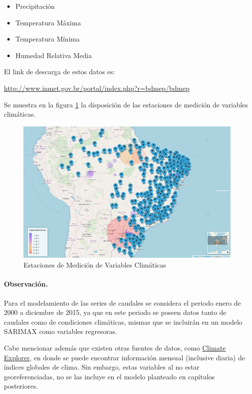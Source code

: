 \documentclass[12pt,oneside]{book}\usepackage[]{graphicx}\usepackage[]{color}
\theoremstyle{definition} %
\begin{document}
\begin{enumerate}
\begin{itemize}


\item Precipitación
\item Temperatura Máxima
\item Temperatura Mínima
\item Humedad Relativa Media


\end{itemize}

El link de descarga de estos datos es:

\url{http://www.inmet.gov.br/portal/index.php?r=bdmep/bdmep}


Se muestra en la figura \ref{fig:mapa_clm} la disposición de las estaciones de medición de variables climáticas.


\begin{figure}[H]
	\centering
	\includegraphics[scale=0.5]{map_estacClm}
	\caption{Estaciones de Medición de Variables Climáticas}\label{fig:mapa_clm}
\end{figure}

\end{enumerate}

\paragraph{Observación.} Para el modelamiento de las series de caudales se considera el periodo enero de 2000 a diciembre de 2015, ya que en este periodo se poseen datos tanto de caudales como de condiciones climáticas, mismas que se incluirán en un modelo SARIMAX como variables regresoras.

Cabe mencionar además que existen otras fuentes de datos, como \href{http://climexp.knmi.nl/start.cgi?id=someone@somewhere}{Climate Explorer}, en donde se puede encontrar información mensual (inclusive diaria) de índices globales de clima. Sin embargo, estas variables al no estar georeferenciadas, no se las incluye en el modelo planteado en capítulos posteriores.
\end{document}
